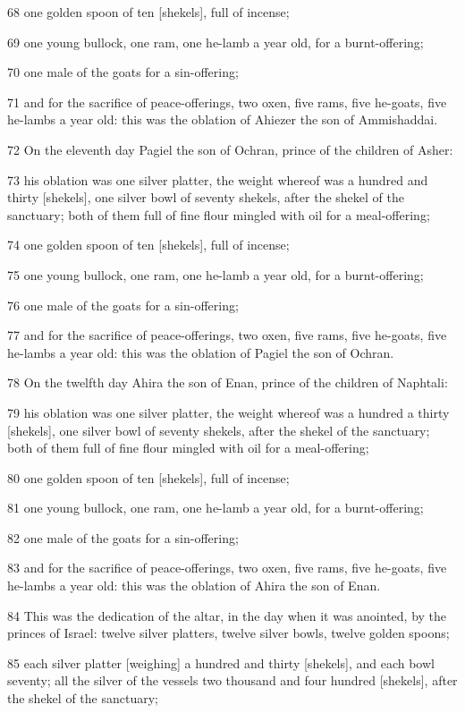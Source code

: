 \par 68 one golden spoon of ten [shekels], full of incense;
\par 69 one young bullock, one ram, one he-lamb a year old, for a burnt-offering;
\par 70 one male of the goats for a sin-offering;
\par 71 and for the sacrifice of peace-offerings, two oxen, five rams, five he-goats, five he-lambs a year old: this was the oblation of Ahiezer the son of Ammishaddai.
\par 72 On the eleventh day Pagiel the son of Ochran, prince of the children of Asher:
\par 73 his oblation was one silver platter, the weight whereof was a hundred and thirty [shekels], one silver bowl of seventy shekels, after the shekel of the sanctuary; both of them full of fine flour mingled with oil for a meal-offering;
\par 74 one golden spoon of ten [shekels], full of incense;
\par 75 one young bullock, one ram, one he-lamb a year old, for a burnt-offering;
\par 76 one male of the goats for a sin-offering;
\par 77 and for the sacrifice of peace-offerings, two oxen, five rams, five he-goats, five he-lambs a year old: this was the oblation of Pagiel the son of Ochran.
\par 78 On the twelfth day Ahira the son of Enan, prince of the children of Naphtali:
\par 79 his oblation was one silver platter, the weight whereof was a hundred a thirty [shekels], one silver bowl of seventy shekels, after the shekel of the sanctuary; both of them full of fine flour mingled with oil for a meal-offering;
\par 80 one golden spoon of ten [shekels], full of incense;
\par 81 one young bullock, one ram, one he-lamb a year old, for a burnt-offering;
\par 82 one male of the goats for a sin-offering;
\par 83 and for the sacrifice of peace-offerings, two oxen, five rams, five he-goats, five he-lambs a year old: this was the oblation of Ahira the son of Enan.
\par 84 This was the dedication of the altar, in the day when it was anointed, by the princes of Israel: twelve silver platters, twelve silver bowls, twelve golden spoons;
\par 85 each silver platter [weighing] a hundred and thirty [shekels], and each bowl seventy; all the silver of the vessels two thousand and four hundred [shekels], after the shekel of the sanctuary;
